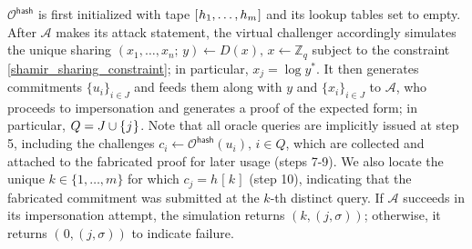 \documentclass[10pt, psamsfonts, reqno]{amsart}
\theoremstyle{definition}
\theoremstyle{remark}
\numberwithin{equation}{section}
\begin{document}
\noindent
$\mathcal{O}^{\mathsf{hash}}$
is first initialized with tape
$[\hspace{0.5pt}h_1, \dots, h_m\hspace{0.5pt}]$
and its lookup tables set to empty.
After $\mathcal{A}$ makes its attack statement,
the virtual challenger accordingly simulates the unique sharing
$(x_1, \dots, x_n;\hspace{2pt} y) \leftarrow D(x),
\hspace{2pt} x \leftarrow \mathbb{Z}_q$
subject to the constraint \eqref{shamir_sharing_constraint};
in particular, $x_j = \log y^*$.
It then generates commitments
$\{u_i\}_{i \in J}$ and feeds them
along with $y$ and $\{x_i\}_{i \in J}$
to $\mathcal{A}$, who proceeds
to impersonation
and generates a proof of the expected form;
in particular, $Q = J \cup \{\hspace{0.5pt}j\hspace{0.5pt}\}$.
Note that all oracle queries are implicitly issued
at step 5, including the challenges
$c_i \leftarrow \mathcal{O}^{\mathsf{hash}}(u_i),\hspace{2pt} i \in Q$,
which are collected and attached to the fabricated
proof for later usage (steps 7-9).
We also locate the unique $k \in \{1, \dots, m\}$
for which $c_j = h\hspace{1pt}[\hspace{1pt}k\hspace{1pt}]$
(step 10), indicating that the fabricated commitment
was submitted at the $k$-th distinct query.
If $\mathcal{A}$ succeeds in its impersonation attempt,
the simulation returns $(k, (j, \sigma))$; otherwise, it
returns $(\hspace{1pt}0, (j, \sigma))$
to indicate failure.
\end{document}
